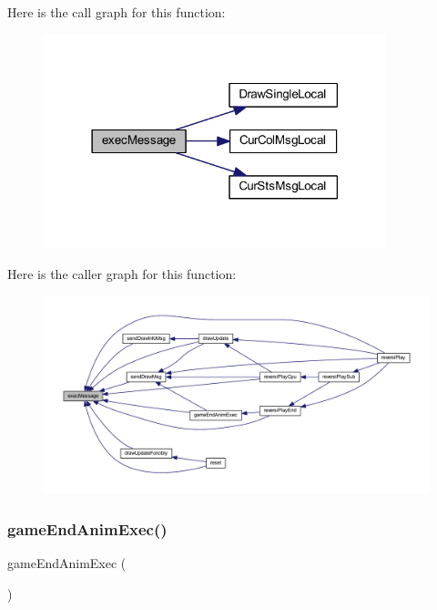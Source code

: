 Here is the call graph for this function\+:
\nopagebreak
\begin{figure}[H]
\begin{center}
\leavevmode
\includegraphics[width=282pt]{class_reversi_play_ae8beea2648c1c5cf722364e84a90edf9_cgraph}
\end{center}
\end{figure}
Here is the caller graph for this function\+:
\nopagebreak
\begin{figure}[H]
\begin{center}
\leavevmode
\includegraphics[width=350pt]{class_reversi_play_ae8beea2648c1c5cf722364e84a90edf9_icgraph}
\end{center}
\end{figure}
\mbox{\label{class_reversi_play_acbcd366da8242203ae52fb685fbc929e}} 
\subsubsection{\texorpdfstring{game\+End\+Anim\+Exec()}{gameEndAnimExec()}}
{\footnotesize\ttfamily game\+End\+Anim\+Exec (\begin{DoxyParamCaption}{ }\end{DoxyParamCaption})}



